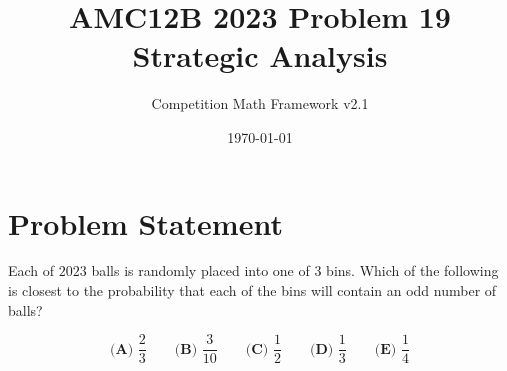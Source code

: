 \documentclass[12pt]{article}
\begin{document}
\title{AMC12B 2023 Problem 19\\Strategic Analysis}
\author{Competition Math Framework v2.1}
\date{\today}
\maketitle

\section*{Problem Statement}

Each of $2023$ balls is randomly placed into one of $3$ bins. Which of the following is closest to the probability that each of the bins will contain an odd number of balls?

$$\textbf{(A) } \frac{2}{3} \qquad \textbf{(B) } \frac{3}{10} \qquad \textbf{(C) } \frac{1}{2} \qquad \textbf{(D) } \frac{1}{3} \qquad \textbf{(E) } \frac{1}{4}$$
\end{document}
